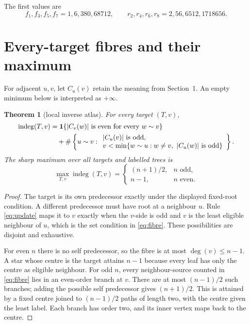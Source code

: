 \documentclass[a4paper,10pt]{amsart}
\newtheorem{theorem}{Theorem}[section]
\theoremstyle{remark}
\newcommand{\indeg}{\operatorname{indeg}}
\begin{document}
The first values are
\begin{equation*}
 f_1,f_3,f_5,f_7=1,6,380,68712,
 \qquad r_2,r_4,r_6,r_8=2,56,6512,1718656.
\end{equation*}

\section{Every-target fibres and their maximum}

For adjacent $u,v$, let $C_u(v)$ retain the meaning from Section~1.  An empty
minimum below is interpreted as $+\infty$.

\begin{theorem}[local inverse atlas]\label{thm:fibre}
For every target $(T,v)$,
\begin{align}\label{eq:fibre}
 \indeg(T,v)
 &=\mathbf1\{|C_v(w)|\text{ is even for every }w\sim v\}\\
 &\quad+\#\left\{u\sim v:\begin{array}{l}
 |C_u(v)|\text{ is odd},\\
 v<\min\{w\sim u:w\ne v,\ |C_u(w)|\text{ is odd}\}
 \end{array}\right\}.\notag
\end{align}
The sharp maximum over all targets and labelled trees is
\begin{equation}\label{eq:max-fibre}
 \max_{T,v}\indeg(T,v)=
 \begin{cases}(n+1)/2,&n\text{ odd},\\ n-1,&n\text{ even}.
 \end{cases}
\end{equation}
\end{theorem}

\begin{proof}
The target is its own predecessor exactly under the displayed fixed-root
condition.  A different predecessor must have root at a neighbour $u$.
Rule \eqref{eq:update} maps it to $v$ exactly when the $v$-side is odd and
$v$ is the least eligible neighbour of $u$, which is the set condition in
\eqref{eq:fibre}.  These possibilities are disjoint and exhaustive.

For even $n$ there is no self predecessor, so the fibre is at most
$\deg(v)\le n-1$.  A star whose centre is the target attains $n-1$ because
every leaf has only the centre as eligible neighbour.  For odd $n$, every
neighbour-source counted in \eqref{eq:fibre} lies in an even-order branch at
$v$.  There are at most $(n-1)/2$ such branches; adding the possible self
predecessor gives $(n+1)/2$.  This is attained by a fixed centre joined to
$(n-1)/2$ paths of length two, with the centre given the least label.  Each
branch has order two, and its inner vertex maps back to the centre.
\end{proof}
\end{document}
